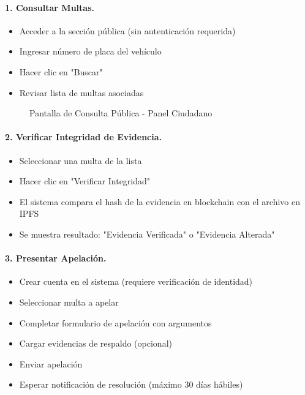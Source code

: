 \paragraph{1. Consultar Multas.}
\begin{itemize}
    \item Acceder a la sección pública (sin autenticación requerida)
    \item Ingresar número de placa del vehículo
    \item Hacer clic en "Buscar"
    \item Revisar lista de multas asociadas
\end{itemize}

\begin{figure}[htbp]
    \centering
    \caption{Pantalla de Consulta Pública - Panel Ciudadano}
\end{figure}

\paragraph{2. Verificar Integridad de Evidencia.}
\begin{itemize}
    \item Seleccionar una multa de la lista
    \item Hacer clic en "Verificar Integridad"
    \item El sistema compara el hash de la evidencia en blockchain 
          con el archivo en IPFS
    \item Se muestra resultado: "Evidencia Verificada" o 
          "Evidencia Alterada"
\end{itemize}

\paragraph{3. Presentar Apelación.}
\begin{itemize}
    \item Crear cuenta en el sistema (requiere verificación de identidad)
    \item Seleccionar multa a apelar
    \item Completar formulario de apelación con argumentos
    \item Cargar evidencias de respaldo (opcional)
    \item Enviar apelación
    \item Esperar notificación de resolución (máximo 30 días hábiles)
\end{itemize}

